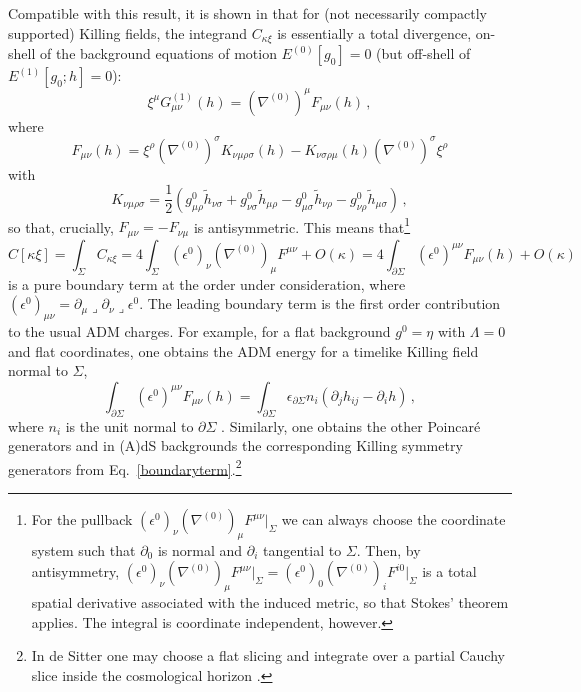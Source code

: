 \documentclass[]{jkpaper}
\theoremstyle{plain}
\theoremstyle{definition}
\newcommand{\sins}{\mathop{\lrcorner}}
\begin{document}
Compatible with this result, it is shown in \cite{Abbott:1981ff,Altas:2019qcv} that for (not necessarily compactly supported) Killing fields, the integrand $C_{\kappa\xi}$ is essentially a total divergence, on-shell of the background equations of motion $E^{(0)}[g_0]=0$ (but off-shell of $E^{(1)}[g_0;h]=0$): 
\begin{equation}\label{totald}
    \xi^\mu G^{(1)}_{\mu \nu}(h)=(\nabla^{(0)})^\mu F_{\mu \nu}(h)\,,
\end{equation}
where 
\begin{equation}\label{Feq}
    F_{\mu \nu}(h)=\xi^\rho(\nabla^{(0)})^\sigma K_{\nu \mu \rho \sigma}(h)-K_{\nu \sigma \rho \mu}(h)(\nabla^{(0)})^\sigma\xi^\rho
\end{equation}
with
\begin{equation}
    K_{\nu \mu \rho \sigma}=\frac{1}{2}\left(g^0_{\mu \rho}\tilde h_{\nu \sigma}+g^0_{\nu \sigma}\tilde{h}_{\mu \rho}-g^0_{\mu \sigma}\tilde{h}_{\nu \rho}-g^0_{\nu \rho}\tilde{h}_{\mu \sigma}\right)\,,
\end{equation}
so that, crucially, $F_{\mu \nu}=-F_{\nu \mu}$ is antisymmetric. This means that\footnote{For the pullback $(\epsilon^0)_\nu(\nabla^{(0)})_\mu F^{\mu \nu}\big|_\Sigma$ we can always choose the coordinate system such that $\partial_0$ is normal and $\partial_i$ tangential to $\Sigma$. Then, by antisymmetry, $(\epsilon^0)_\nu(\nabla^{(0)})_\mu F^{\mu \nu}\big|_\Sigma=(\epsilon^0)_0(\nabla^{(0)})_iF^{i0}\big|_\Sigma$ is a total spatial derivative associated with the induced metric, so that Stokes' theorem applies. The integral is coordinate independent, however.}
\begin{equation}\label{boundaryterm}
C[\kappa\xi]=\int_\Sigma C_{\kappa\xi}=4\int_\Sigma(\epsilon^0)_\nu(\nabla^{(0)})_\mu F^{\mu \nu}+O(\kappa)=4\int_{\partial\Sigma} (\epsilon^0)^{\mu \nu}F_{\mu \nu}(h)+O(\kappa)
\end{equation}
is a pure boundary term at the order under consideration, where $(\epsilon^0)_{\mu \nu}=\partial_\mu\sins\partial_\nu\sins \epsilon^0$. The leading boundary term is the first order contribution to the usual ADM charges.  For example, for a flat background $g^0=\eta$ with $\Lambda=0$ and flat coordinates, one obtains the ADM energy for a timelike Killing field normal to $\Sigma$,
\begin{equation}
\int_{\partial\Sigma} (\epsilon^0)^{\mu \nu}F_{\mu \nu}(h)=\int_{\partial\Sigma}\epsilon_{\partial\Sigma}n_i(\partial_j h_{ij}-\partial_i h)\,,
\end{equation}
where $n_i$ is the unit normal to $\partial\Sigma$ \cite{Abbott:1981ff}. Similarly, one obtains the other Poincar\'e generators and in (A)dS backgrounds the corresponding Killing symmetry generators from Eq.~\eqref{boundaryterm}.\footnote{In de Sitter one may choose a flat slicing and integrate over a partial Cauchy slice inside the cosmological horizon \cite{Abbott:1981ff}.}
\end{document}
